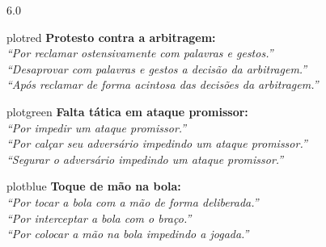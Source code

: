 \documentclass[a0,portrait]{a0poster}
\begin{document}
\begin{textblock}{6.0}
\vspace{2mm}
\begin{destaque}{plotred}
{\large\bfseries\color{plotgray} Protesto contra a arbitragem:}\\[1mm]
\itshape\large
``Por reclamar ostensivamente com palavras e gestos.'' \\[1.5mm]
``Desaprovar com palavras e gestos a decis\~ao da arbitragem.'' \\[1.5mm]
``Ap\'os reclamar de forma acintosa das decis\~oes da arbitragem.''
\end{destaque}

\vspace{2mm}
\begin{destaque}{plotgreen}
{\large\bfseries\color{plotgray} Falta t\'atica em ataque promissor:}\\[1mm]
\itshape\large
``Por impedir um ataque promissor.'' \\[1.5mm]
``Por cal\c{c}ar seu advers\'ario impedindo um ataque promissor.'' \\[1.5mm]
``Segurar o advers\'ario impedindo um ataque promissor.''
\end{destaque}

\vspace{2mm}
\begin{destaque}{plotblue}
{\large\bfseries\color{plotgray} Toque de m\~ao na bola:}\\[1mm]
\itshape\large
``Por tocar a bola com a m\~ao de forma deliberada.'' \\[1.5mm]
``Por interceptar a bola com o bra\c{c}o.'' \\[1.5mm]
``Por colocar a m\~ao na bola impedindo a jogada.''
\end{destaque}

\end{textblock}
\end{document}
